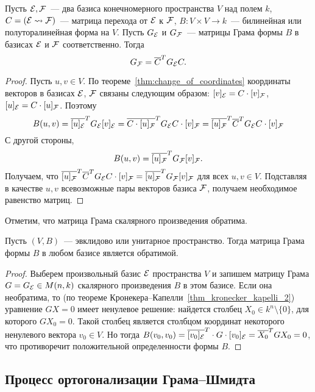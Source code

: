 \begin{theorem}\label{thm:Gram_matrix_change_of_coordinates}
Пусть $\mathcal E, \mathcal F$~--- два базиса конечномерного пространства $V$
над полем $k$, $C = (\mathcal E\rightsquigarrow\mathcal F)$~--- матрица перехода от $\mathcal E$
к $\mathcal F$, $B\colon V\times V\to k$~--- билинейная или
полуторалинейная форма на $V$. Пусть $G_{\mathcal E}$ и $G_{\mathcal F}$~---
матрицы Грама формы $B$ в базисах 
$\mathcal E$ и $\mathcal F$ соответственно.  Тогда
$$
G_{\mathcal F} = \overline{C}^T G_{\mathcal E}C.
$$
\end{theorem}

\begin{proof}
Пусть $u,v\in V$. По теореме~\ref{thm:change_of_coordinates}
координаты векторов в базисах $\mathcal E$, $\mathcal F$ связаны следующим
образом:
$[v]_{\mathcal E} = C\cdot [v]_{\mathcal F}$,
$[u]_{\mathcal E} = C\cdot [u]_{\mathcal F}$.
Поэтому
$$
B(u,v) = \overline{[u]_{\mathcal E}}^T G_{\mathcal E}[v]_{\mathcal E} =
\overline{C\cdot[u]_{\mathcal F}}^T G_{\mathcal E}C\cdot [v]_{\mathcal F} =
\overline{[u]_{\mathcal F}}^T\overline{C}^T G_{\mathcal E}C\cdot [v]_{\mathcal F}
$$
С другой стороны,
$$
B(u,v) = \overline{[u]_{\mathcal F}}^T G_{\mathcal F}[v]_{\mathcal F}.
$$
Получаем, что $\overline{[u]_{\mathcal F}}^T\overline{C}^T G_{\mathcal E}C\cdot [v]_{\mathcal F}
= \overline{[u]_{\mathcal F}}^T G_{\mathcal F}[v]_{\mathcal F}$ для всех $u,v\in
V$. Подставляя в качестве $u,v$ всевозможные пары векторов базиса $\mathcal
F$, получаем необходимое равенство матриц.
\end{proof}

Отметим, что матрица Грама скалярного
произведения обратима.

\begin{proposition}
Пусть $(V,B)$~--- эвклидово или унитарное пространство. Тогда матрица
Грама формы $B$ в любом базисе является обратимой.
\end{proposition}
\begin{proof}
Выберем произвольный базис $\mathcal E$ пространства $V$ и запишем матрицу
Грама $G=G_{\mathcal E}\in M(n,k)$ скалярного произведения $B$ в этом
базисе. Если она необратима, то (по теореме
Кронекера--Капелли~\ref{thm_kronecker_kapelli_2}) уравнение
$GX=0$ имеет ненулевое решение: найдется столбец
$X_0\in k^n\setminus\{0\}$, для которого
$GX_0=0$. Такой столбец является столбцом координат некоторого
ненулевого вектора $v_0\in V$. Но тогда
$B(v_0,v_0) = \overline{[v_0]_{\mathcal E}}^T\cdot G\cdot [v_0]_{\mathcal E} =
\overline{X_0}^TGX_0 = 0$, что противоречит положительной определенности
формы $B$.
\end{proof}

\subsection{Процесс ортогонализации Грама--Шмидта}

